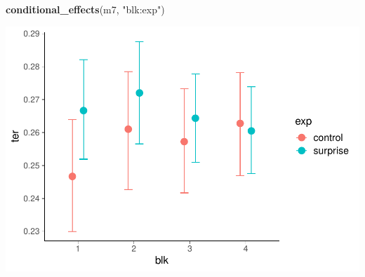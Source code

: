 \documentclass[
]{article}
\newenvironment{Shaded}{\begin{snugshade}}{\end{snugshade}}
\newcommand{\FunctionTok}[1]{\textcolor[rgb]{0.13,0.29,0.53}{\textbf{#1}}}
\newcommand{\NormalTok}[1]{#1}
\newcommand{\StringTok}[1]{\textcolor[rgb]{0.31,0.60,0.02}{#1}}
\begin{document}
\begin{Shaded}
\begin{Highlighting}[]
\FunctionTok{conditional\_effects}\NormalTok{(m7, }\StringTok{"blk:exp"}\NormalTok{)}
\end{Highlighting}
\end{Shaded}

\includegraphics{params_analyses_files/figure-latex/unnamed-chunk-8-3.pdf}
\end{document}
